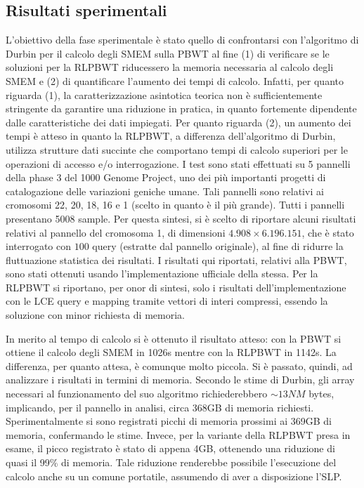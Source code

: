 \documentclass[a4paper,11pt, oneside,italian]{article}
\begin{document}
\subsection*{Risultati sperimentali}
L'obiettivo della fase sperimentale è stato quello di confrontarsi con
l'algoritmo di Durbin per il calcolo degli SMEM sulla PBWT al fine 
(1) di verificare se le soluzioni per la RLPBWT riducessero la memoria
necessaria al calcolo degli 
SMEM e (2) di quantificare l'aumento dei tempi di calcolo.
Infatti, per quanto riguarda (1), la caratterizzazione asintotica teorica non è
sufficientemente stringente da garantire una riduzione in pratica, in quanto
fortemente dipendente dalle caratteristiche dei dati impiegati.
Per quanto riguarda (2), un aumento dei tempi è atteso in quanto la RLPBWT,
a differenza dell'algoritmo di Durbin, utilizza strutture dati succinte che
comportano tempi di calcolo superiori per le operazioni di accesso e/o
interrogazione. 
I test sono stati effettuati su 5 pannelli della phase 3 del 1000 Genome
Project, uno dei più importanti progetti di catalogazione delle variazioni
geniche 
umane. Tali pannelli sono relativi ai cromosomi 22, 20, 18, 16 e 1
(scelto in quanto è il più grande). Tutti i pannelli presentano 5008 sample.
Per questa sintesi, si è scelto di riportare alcuni risultati relativi al
pannello del cromosoma 1, di dimensioni $4.908 \times 6.196.151$, che è stato
interrogato con $100$ query (estratte dal pannello originale), al 
fine di ridurre la fluttuazione statistica dei risultati.
I risultati qui riportati, relativi alla PBWT, sono stati ottenuti usando
l'implementazione ufficiale della stessa. Per la RLPBWT si riportano, per onor
di sintesi, solo i
risultati dell'implementazione con le LCE query e mapping tramite vettori di
interi compressi, essendo la soluzione con minor richiesta di memoria. 

In merito al tempo di calcolo si è ottenuto il risultato atteso: con
la PBWT si ottiene il calcolo degli SMEM in 1026s
mentre con la RLPBWT in 1142s. La differenza, per quanto attesa, è comunque
molto piccola.
Si è passato, quindi, ad analizzare i risultati in termini di memoria. Secondo
le stime di Durbin, gli array necessari al funzionamento del suo algoritmo
richiederebbero $\sim13NM$ bytes, implicando, per il pannello in analisi, circa
368GB di memoria richiesti. 
Sperimentalmente si sono registrati
picchi di memoria prossimi ai 369GB di memoria, confermando le stime. Invece,
per la variante della RLPBWT presa in esame, il picco
registrato è stato di appena 4GB, 
ottenendo una riduzione di quasi il 99\% di memoria. Tale riduzione renderebbe
possibile l'esecuzione del calcolo anche su un comune portatile, assumendo di
aver a disposizione l'SLP. 
\end{document}

